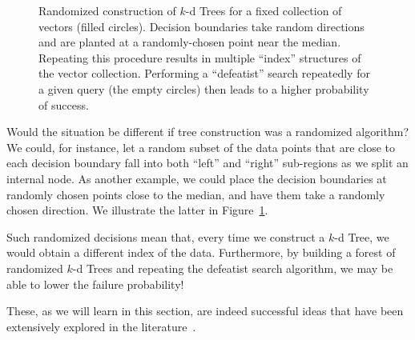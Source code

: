 \begin{figure}[t]
    \centering
    \caption{Randomized construction of $k$-d Trees for a fixed collection of vectors (filled circles).
    Decision boundaries take random directions
    and are planted at a randomly-chosen point near the median. Repeating this procedure
    results in multiple ``index'' structures of the vector collection. Performing a ``defeatist'' search
    repeatedly for a given query (the empty circles) then leads to a higher probability of success.}
    \label{figure:branch-and-bound:randomized}
\end{figure}

Would the situation be different if tree construction was a randomized algorithm?
We could, for instance, let a random subset of the data points that are close to
each decision boundary fall into both ``left'' and ``right'' sub-regions as we split an internal node.
As another example, we could place the decision boundaries at randomly chosen points
close to the median, and have them take a randomly chosen direction.
We illustrate the latter in Figure~\ref{figure:branch-and-bound:randomized}.

\begin{svgraybox}
Such randomized decisions mean that, every time we construct a $k$-d Tree, we would obtain a different
index of the data. Furthermore, by building a forest of randomized $k$-d Trees and repeating
the defeatist search algorithm, we may be able to lower the failure probability!
\end{svgraybox}

These, as we will learn in this section, are indeed successful ideas that have
been extensively explored in the literature~\citep{liu2004SpillTree,ram2019revisiting_kdtree,dasgupta2015rptrees}.

